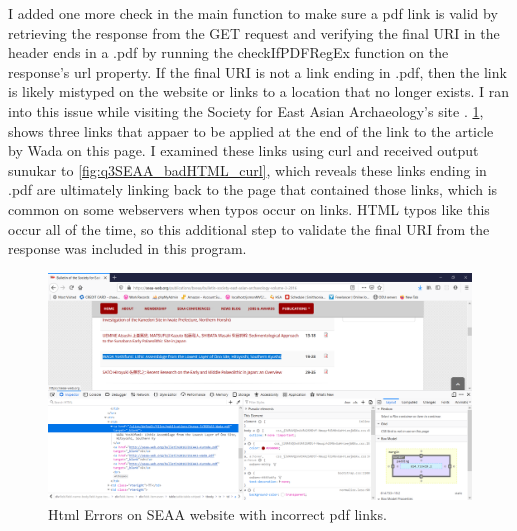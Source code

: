 \documentclass[12pt]{article}
\begin{document}
I added one more check in the main function to make sure a pdf link is valid by retrieving the response from the GET request and verifying the final URI in the header ends in a .pdf by running the checkIfPDFRegEx function on the response's url property. If the final URI is not a link ending in .pdf, then the link is likely mistyped on the website or links to a location that no longer exists. I ran into this issue while visiting the Society for East Asian Archaeology's site \cite{bulletin2016SEAA}.  \ref{fig:q3SEAA_badHTML}, shows three links that appaer to be applied at the end of the link to the article by Wada on this page. I examined these links using curl and received output sunukar to \ref{fig:q3SEAA_badHTML_curl}, which reveals these links ending in .pdf are ultimately linking back to the page that contained those links, which is common on some webservers when typos occur on links. HTML typos like this occur all of the time, so this additional step to validate the final URI from the response was included in this program.

\begin{figure}[H]
    \centering
    \includegraphics[trim=0 60 10 20, clip, width=\textwidth] {Q3/seaaBadHTML.png}
    \caption{Html Errors on SEAA website with incorrect pdf links. }
    \label{fig:q3SEAA_badHTML}
\end{figure}
\end{document}

